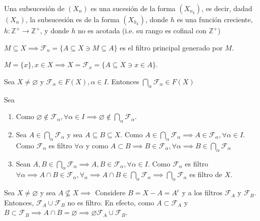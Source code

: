 \begin{definicion}[Subsucesión]
    Una subsucesión de $(X_n)$ es una sucesión de la forma $(X_{n_k})$, es decir, dadad $(X_n)$, la subsucesión es de la forma $(X_{h_k})$, donde $h$ es una función creciente, $h:\mathbb{Z}^+\to \mathbb{Z}^+$, y donde $h$ no es acotada (i.e. su rango es cofinal con $\mathbb{Z}^+$)
\end{definicion}


\begin{ejemplo}
    $M\subseteq X\implies \mathcal{F}_n=\{A\subseteq X\ni M\subseteq A\}$ es el filtro principal generado por $M$. 
\end{ejemplo}
\begin{ejemplo}
    $M=\{x\},x\in X\implies X=\mathcal{F}_x=\{A\subseteq X\ni x\in A\}$. 
\end{ejemplo}


\begin{teorema}
    Sea $X\neq \varnothing$ y $\mathcal{F}_\alpha\in F(X),\alpha\in I$. Entonces $\bigcap_\alpha \mathcal{F}_\alpha \in F(X)$
    \begin{dem}
        Sea 
        \begin{enumerate}
            \item Como $\varnothing\not\in \mathcal{F}_\alpha,\forall \alpha \in I\implies \varnothing \not\in \bigcap_\alpha \mathcal{F}_\alpha$.
            \item Sea $A\in \bigcap_\alpha \mathcal{F}_\alpha$ y sea $A\subseteq B\subseteq X$. Como $A\in \bigcap_\alpha \mathcal{F}_\alpha\implies A\in \mathcal{F}_\alpha,\forall \alpha\in I$. Como $\mathcal{F}_\alpha$ es filtro $\forall \alpha$ y como $A\subset B\implies B\in \mathcal{F}_\alpha,\forall \alpha \implies B\in \bigcap_\alpha \mathcal{F}_\alpha $
            \item Sean $A,B\in \bigcap_\alpha \mathcal{F}_\alpha \implies A,B\in \mathcal{F}_\alpha,\forall \alpha \in I$. Como $\mathcal{F}_\alpha$ es filtro $\forall \alpha \implies A\cap B\in \mathcal{F}_\alpha,\forall_\alpha\implies A\cap B \in \bigcap_{\alpha}\mathcal{F}_\alpha\implies \bigcap_\alpha \mathcal{F}_\alpha$ es filtro de $X$.  
        \end{enumerate}
    \end{dem}
\end{teorema}

\begin{nota}
    Sea $X\neq\varnothing$ y sea $A\not\subseteq X\implies$ Considere $B=X-A=A^c$ y a los filtros $\mathcal{F}_A$ y $\mathcal{F}_B$. Entonces, $\mathcal{F}_A\cup \mathcal{F}_B$ no es filtro. En efecto, como $A\subset \mathcal{F}_A$ y $B\subset \mathcal{F}_B\implies A\cap B=\varnothing\implies \varnothing \mathcal{F}_A\cup \mathcal{F}_B$. 
\end{nota}

